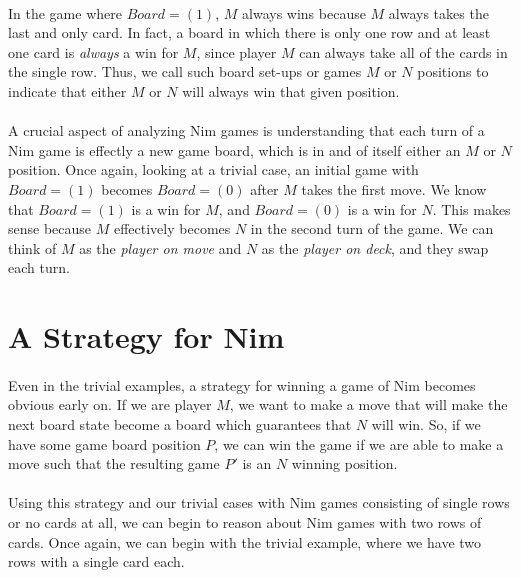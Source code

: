 \documentclass{article}
\begin{document}
\paragraph{}
In the game where $Board = ( 1 )$, $M$ always wins because $M$ always takes the last and only card. In fact, a board in which there is only one row and at least one card is \textit{always} a win for $M$, since player $M$ can always take all of the cards in the single row. Thus, we call such board set-ups or games $M$ or $N$ positions to indicate that either $M$ or $N$ will always win that given position.

\paragraph{}
A crucial aspect of analyzing Nim games is understanding that each turn of a Nim game is effectly a new game board, which is in and of itself either an $M$ or $N$ position. Once again, looking at a trivial case, an initial game with $Board = ( 1 )$ becomes $Board = (0)$ after $M$ takes the first move. We know that $Board = (1)$ is a win for $M$, and $Board = (0)$ is a win for $N$. This makes sense because $M$ effectively becomes $N$ in the second turn of the game. We can think of $M$ as the \textit{player on move} and $N$ as the \textit{player on deck}, and they swap each turn.

\section*{A Strategy for Nim}
\paragraph{}
Even in the trivial examples, a strategy for winning a game of Nim becomes obvious early on. If we are player $M$, we want to make a move that will make the next board state become a board which guarantees that $N$ will win. So, if we have some game board position $P$, we can win the game if we are able to make a move such that the resulting game $P'$ is an $N$ winning position.

\paragraph{}
Using this strategy and our trivial cases with Nim games consisting of single rows or no cards at all, we can begin to reason about Nim games with two rows of cards. Once again, we can begin with the trivial example, where we have two rows with a single card each.
\end{document}
